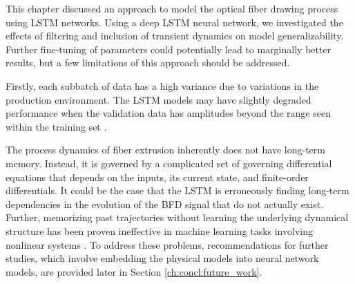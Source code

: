 This chapter discussed an approach to model the optical fiber drawing process using LSTM networks. Using a deep LSTM neural network, we investigated the effects of filtering and inclusion of transient dynamics on model generalizability. Further fine-tuning of parameters could potentially lead to marginally better results, but a few limitations of this approach should be addressed. 

Firstly, each subbatch of data has a high variance due to variations in the production environment. The LSTM models may have slightly degraded performance when the validation data has amplitudes beyond the range seen within the training set \cite{lstm_amplitude}.

The process dynamics of fiber extrusion inherently does not have long-term memory. Instead, it is governed by a complicated set of governing differential equations that depends on the inputs, its current state, and finite-order differentials. It could be the case that the LSTM is erroneously finding long-term dependencies in the evolution of the BFD signal that do not actually exist. Further, memorizing past trajectories without learning the underlying dynamical structure has been proven ineffective in machine learning tasks involving nonlinear systems \cite{fu_et_al}. To address these problems, recommendations for further studies, which involve embedding the physical models into neural network models, are provided later in Section \ref{ch:concl:future_work}.